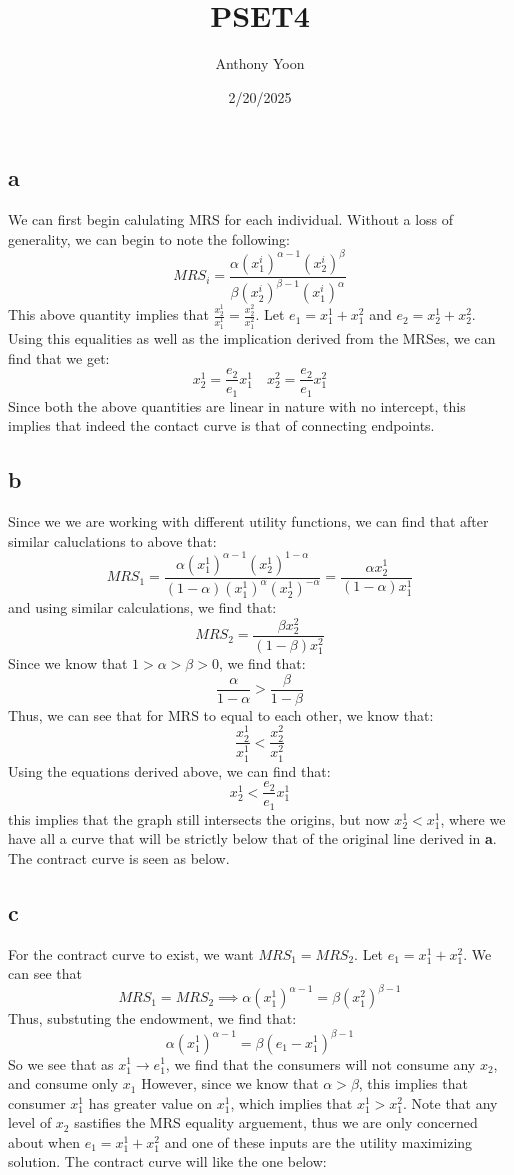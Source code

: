 \documentclass[11pt]{article}
\title{PSET4}
\author{Anthony Yoon}
\date{2/20/2025}
\begin{document}
\maketitle
\section{}
\subsection*{a}
We can first begin calulating MRS for each individual. Without a loss of generality, we can begin to note the following:
\[
MRS_i = \frac{\alpha (x_1^i)^{\alpha -1}(x_2^i)^\beta}{\beta(x_2^i)^{\beta - 1}(x_1^i)^\alpha}
\]
This above quantity implies that $\frac{x_2^1}{x_1^1} = \frac{x_2^2}{x_1^2}$. Let $e_1 = x_1^1 + x_1^2$ and $e_2 = x_2^1 + x_2^2$. Using this equalities as well as the implication derived from the MRSes, we can find that we get:
\[
x_2^1 = \frac{e_2}{e_1} x_1^1 \quad x_2^2 = \frac{e_2}{e_1} x_1^2
\]
Since both the above quantities are linear in nature with no intercept, this implies that indeed the contact curve is that of connecting endpoints. 
\subsection*{b}
Since we we are working with different utility functions, we can find that after similar caluclations to above that:
\[
MRS_1 = \frac{\alpha (x_1^1)^{\alpha - 1}(x_2^1)^{1-\alpha}}{(1-\alpha)(x_1^1)^\alpha (x_2^1)^{-\alpha}} = \frac{\alpha x_2^1}{(1-\alpha)x_1^1}
\]
and using similar calculations, we find that:
\[
MRS_2 = \frac{\beta x^2_2}{(1-\beta)x_1^2}
\]
Since we know that $1 > \alpha > \beta > 0$, we find that:
\[
\frac{\alpha}{1-\alpha} > \frac{\beta}{1-\beta}
\]
Thus, we can see that for MRS to equal to each other, we know that:
\[
\frac{x_2^1}{x_1^1} < \frac{x^2_2}{x^2_1}
\]
Using the equations derived above, we can find that:
\[
x_2^1 < \frac{e_2}{e_1} x_1^1
\]
this implies that the graph still intersects the origins, but now $x_2^1 < x_1^1$, where we have all a curve that will be strictly below that of the original line derived in \textbf{a}. The contract curve is seen as below. 
\subsection*{c}
For the contract curve to exist, we want $MRS_1 = MRS_2$. Let $e_1 = x_1^1 + x_1^2$. We can see that
\[
MRS_1 = MRS_2 \implies \alpha (x_1^1)^{\alpha - 1} = \beta (x_1^2)^{\beta - 1}
\]
Thus, substuting the endowment, we find that:
\[
    \alpha(x_1^1)^{\alpha - 1} = \beta (e_1 - x_1^1)^{\beta - 1}
\]
So we see that as $ x_1^1 \to e^1_1$, we find that the consumers will not consume any $x_2$, and consume only $x_1$ However, since we know that $\alpha > \beta$, this implies that consumer $x_1^1$ has greater value on $x_1^1$, which implies that $x_1^1  > x_1^2$. Note that any level of $x_2$ sastifies the MRS equality arguement, thus we are only concerned about when $e_1 = x_1^1 + x_1^2$ and one of these inputs are the utility maximizing solution. The contract curve will like the one below:
\end{document}
